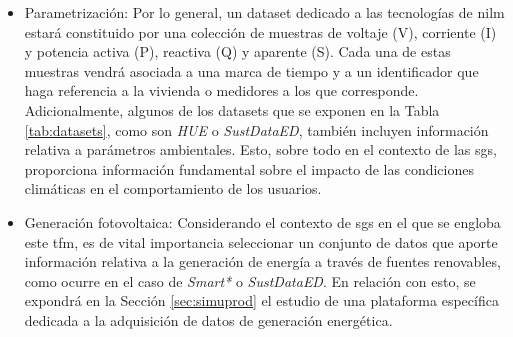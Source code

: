\begin{itemize}
    \item Parametrización: Por lo general, un dataset dedicado a las tecnologías de \gls{nilm} estará constituido por una colección de muestras de voltaje (V), corriente (I) y potencia activa (P), reactiva (Q) y aparente (S). Cada una de estas muestras vendrá asociada a una marca de tiempo y a un identificador que haga referencia a la vivienda o medidores a los que corresponde. Adicionalmente, algunos de los datasets que se exponen en la Tabla \ref{tab:datasets}, como son \textit{HUE} o \textit{SustDataED}, también incluyen información relativa a parámetros ambientales. Esto, sobre todo en el contexto de las \gls{sg}s, proporciona información fundamental sobre el impacto de las condiciones climáticas en el comportamiento de los usuarios.
    \item Generación fotovoltaica: Considerando el contexto de \gls{sg}s en el que se engloba este \gls{tfm}, es de vital importancia seleccionar un conjunto de datos que aporte información relativa a la generación de energía a través de fuentes renovables, como ocurre en el caso de \textit{Smart*} o \textit{SustDataED}. En relación con esto, se expondrá en la Sección \ref{sec:simuprod} el estudio de una plataforma específica dedicada a la adquisición de datos de generación energética.
\end{itemize}

